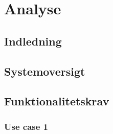 \documentclass[rapport.tex]{subfiles}
\begin{document}
\section{Analyse}
	\subsection{Indledning}
	\subsection{Systemoversigt}
	\subsection{Funktionalitetskrav}
		\subsubsection{Use case 1}
\end{document}

